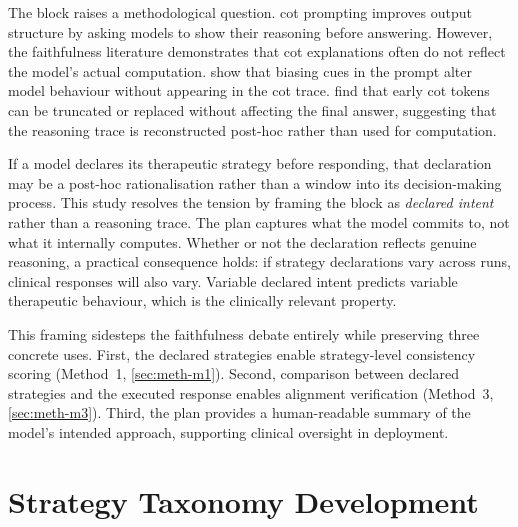 The  block raises a methodological question. \gls{cot}
prompting \parencite{KE8ZHW9V} improves output structure by asking models
to show their reasoning before answering. However, the faithfulness
literature demonstrates that \gls{cot} explanations often do not reflect
the model's actual computation. \textcite{TMCBKEVQ} show that biasing cues
in the prompt alter model behaviour without appearing in the \gls{cot}
trace. \textcite{W4K3ARI5} find that early \gls{cot} tokens can be
truncated or replaced without affecting the final answer, suggesting that
the reasoning trace is reconstructed post-hoc rather than used for
computation.

If a model declares its therapeutic strategy before responding, that
declaration may be a post-hoc rationalisation rather than a window into its
decision-making process. This study resolves the tension by framing the
 block as \emph{declared intent} rather than a reasoning
trace. The plan captures what the model commits to, not what it internally
computes. Whether or not the declaration reflects genuine reasoning, a
practical consequence holds: if strategy declarations vary across runs,
clinical responses will also vary. Variable declared intent predicts
variable therapeutic behaviour, which is the clinically relevant property.

This framing sidesteps the faithfulness debate entirely while preserving
three concrete uses. First, the declared strategies enable strategy-level
consistency scoring (Method~1, \autoref{sec:meth-m1}). Second, comparison
between declared strategies and the executed response enables alignment
verification (Method~3, \autoref{sec:meth-m3}). Third, the plan provides
a human-readable summary of the model's intended approach, supporting
clinical oversight in deployment.



\section{Strategy Taxonomy Development}
\label{sec:meth-taxonomy}


